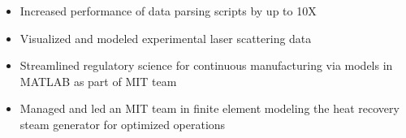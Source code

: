 \documentclass[10.95pt,letterpaper]{altacv}
\newlength{\comlogowidth}
\newcommand{\companylogo}[1]{%
	\savebox{\comlogobox}{\texttt{[image: \#1]}}%
	\settowidth{\comlogowidth}{\usebox{\comlogobox}}
}
\begin{document}
\begin{itemize}
	\item Increased performance of data parsing scripts by up to 10X
\end{itemize}
\divider	
	
	\begin{itemize}
		\item Visualized and modeled experimental laser scattering data
	\end{itemize}	
	\divider
	
	\begin{itemize}
		\item Streamlined regulatory science for continuous manufacturing via
		models in MATLAB as part of MIT team
	\end{itemize}
	\divider
	

	\begin{itemize}
	\item Managed and led an MIT team in finite element modeling the heat recovery steam generator for optimized operations
	\end{itemize}
	
%	

 
	
\end{document}
